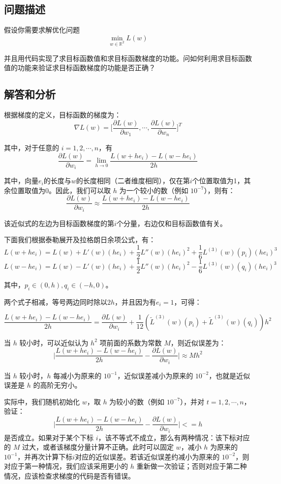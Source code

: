 \documentclass[12pt]{article}
\begin{document}
\subsection{问题描述}
假设你需要求解优化问题
$$
\min_{w\in\mathbb{R}^2}L(w)
$$

并且用代码实现了求目标函数值和求目标函数梯度的功能。问如何利用求目标函数值的功能来验证求目标函数梯度的功能是否正确？

\subsection{解答和分析}
根据梯度的定义，目标函数的梯度为：
$$
\nabla L(w) = \big[\frac{\partial L(w)}{\partial w_1}, \cdots, \frac{\partial L(w)}{\partial w_n}\big]^T
$$

其中，对于任意的 $i = 1, 2, \cdots, n$，有
$$
\frac{\partial L(w)}{\partial w_i} = \lim_{h\rightarrow 0}\frac{L(w+he_i) - L(w-he_i)}{2h}
$$

其中，向量$e_i$的长度与$w$的长度相同（二者维度相同），仅在第$i$个位置取值为1，其余位置取值为0。因此，我们可以取 $h$ 为一个较小的数（例如 $10^{-7}$），则有：
$$
\frac{\partial L(w)}{\partial w_i} \approx \frac{L(w+he_i) - L(w-he_i)}{2h}
$$

该近似式的左边为目标函数梯度的第$i$个分量，右边仅和目标函数值有关。

下面我们根据泰勒展开及拉格朗日余项公式，有：
$$
L(w+he_i) = L(w) + L'(w)(he_i) + \frac{1}{2} L''(w)(he_i)^2 + \frac{1}{6}L^{(3)}(w)(p_i)(he_i)^3
$$
$$
L(w-he_i) = L(w) - L'(w)(he_i) + \frac{1}{2} L''(w)(he_i)^2 - \frac{1}{6}L^{(3)}(w)(q_i)(he_i)^3
$$

其中，$p_i \in (0,h), q_i \in (-h,0)$。

两个式子相减，等号两边同时除以$2h$，并且因为有$e_i=1$，可得：

$$
\frac{L(w+he_i) - L(w-he_i)}{2h} = \frac{\partial L(w)}{\partial w_i} + \frac{1}{12}(\tilde L^{(3)}(w)(p_i) + \tilde L^{(3)}(w)(q_i))h^2
$$

当 $h$ 较小时，可以近似认为 $h^2$ 项前面的系数为常数 $M$，则近似误差为：
$$
\big|\frac{L(w+he_i) - L(w-he_i)}{2h} - \frac{\partial L(w)}{\partial w_i}\big| \approx Mh^2
$$

当 $h$ 较小时，$h$ 每减小为原来的 $10^{-1}$，近似误差减小为原来的 $10^{-2}$，也就是近似误差是 $h$ 的高阶无穷小。

实际中，我们随机初始化 $w$，取 $h$ 为较小的数（例如 $10^{-7}$），并对 $t = 1, 2, \cdots, n$，验证：
$$
\big|\frac{L(w+he_i) - L(w-he_i)}{2h} - \frac{\partial L(w)}{\partial w_i}\big| <= h
$$
是否成立。如果对于某个下标 $i$，该不等式不成立，那么有两种情况：该下标对应的 $M$ 过大，或者该梯度分量计算不正确。此时可以固定 $w$，减小 $h$ 为原来的 $10^{-1}$，并再次计算下标$i$对应的近似误差。若该近似误差约减小为原来的 $10^{-2}$，则对应于第一种情况，我们应该采用更小的 $h$ 重新做一次验证；否则对应于第二种情况，应该检查求梯度的代码是否有错误。



\end{document}
